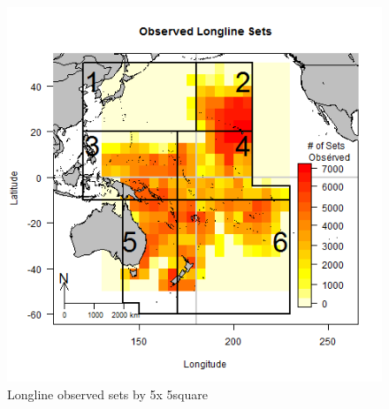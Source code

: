 \documentclass[12pt]{SCreport}
\begin{document}
\begin{figure}
\begin{center}
\includegraphics[scale=0.95]{../GRAPHICS/Defined/FIG_03_obs_ll_sets}
\caption{\label{fig:fig03} Longline observed sets by 5\degree x 5\degree square}
\end{center}
\end{figure}
\end{document}
